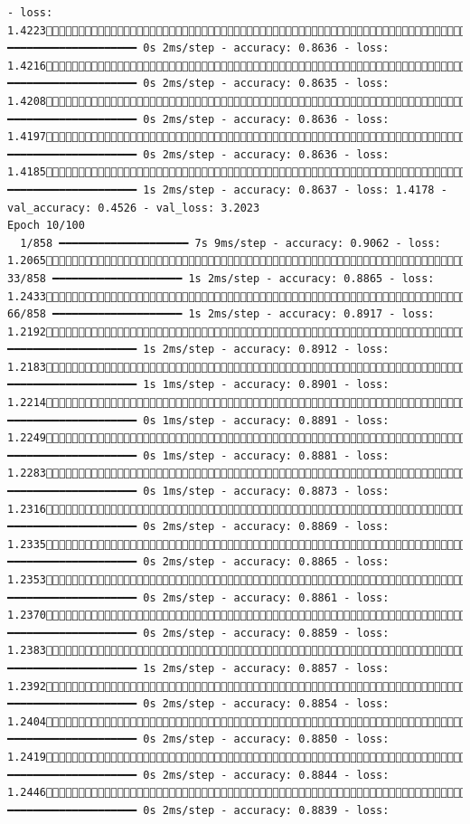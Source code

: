 \documentclass[
  letterpaper,
  DIV=11,
  numbers=noendperiod]{scrartcl}
\begin{document}
\begin{verbatim}
- loss: 1.4223736/858 ━━━━━━━━━━━━━━━━━━━━ 0s 2ms/step - accuracy: 0.8636 - loss: 1.4216772/858 ━━━━━━━━━━━━━━━━━━━━ 0s 2ms/step - accuracy: 0.8635 - loss: 1.4208807/858 ━━━━━━━━━━━━━━━━━━━━ 0s 2ms/step - accuracy: 0.8636 - loss: 1.4197841/858 ━━━━━━━━━━━━━━━━━━━━ 0s 2ms/step - accuracy: 0.8636 - loss: 1.4185858/858 ━━━━━━━━━━━━━━━━━━━━ 1s 2ms/step - accuracy: 0.8637 - loss: 1.4178 - val_accuracy: 0.4526 - val_loss: 3.2023
Epoch 10/100
  1/858 ━━━━━━━━━━━━━━━━━━━━ 7s 9ms/step - accuracy: 0.9062 - loss: 1.2065 33/858 ━━━━━━━━━━━━━━━━━━━━ 1s 2ms/step - accuracy: 0.8865 - loss: 1.2433 66/858 ━━━━━━━━━━━━━━━━━━━━ 1s 2ms/step - accuracy: 0.8917 - loss: 1.2192100/858 ━━━━━━━━━━━━━━━━━━━━ 1s 2ms/step - accuracy: 0.8912 - loss: 1.2183137/858 ━━━━━━━━━━━━━━━━━━━━ 1s 1ms/step - accuracy: 0.8901 - loss: 1.2214175/858 ━━━━━━━━━━━━━━━━━━━━ 0s 1ms/step - accuracy: 0.8891 - loss: 1.2249211/858 ━━━━━━━━━━━━━━━━━━━━ 0s 1ms/step - accuracy: 0.8881 - loss: 1.2283241/858 ━━━━━━━━━━━━━━━━━━━━ 0s 1ms/step - accuracy: 0.8873 - loss: 1.2316258/858 ━━━━━━━━━━━━━━━━━━━━ 0s 2ms/step - accuracy: 0.8869 - loss: 1.2335275/858 ━━━━━━━━━━━━━━━━━━━━ 0s 2ms/step - accuracy: 0.8865 - loss: 1.2353293/858 ━━━━━━━━━━━━━━━━━━━━ 0s 2ms/step - accuracy: 0.8861 - loss: 1.2370310/858 ━━━━━━━━━━━━━━━━━━━━ 0s 2ms/step - accuracy: 0.8859 - loss: 1.2383324/858 ━━━━━━━━━━━━━━━━━━━━ 1s 2ms/step - accuracy: 0.8857 - loss: 1.2392345/858 ━━━━━━━━━━━━━━━━━━━━ 0s 2ms/step - accuracy: 0.8854 - loss: 1.2404371/858 ━━━━━━━━━━━━━━━━━━━━ 0s 2ms/step - accuracy: 0.8850 - loss: 1.2419403/858 ━━━━━━━━━━━━━━━━━━━━ 0s 2ms/step - accuracy: 0.8844 - loss: 1.2446431/858 ━━━━━━━━━━━━━━━━━━━━ 0s 2ms/step - accuracy: 0.8839 - loss: 
\end{verbatim}
\end{document}
